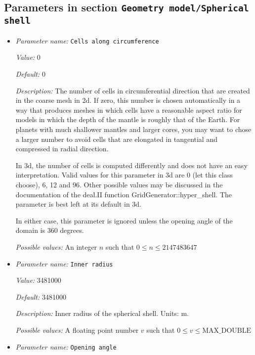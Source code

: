 \subsection{Parameters in section \tt Geometry model/Spherical shell}
\label{parameters:Geometry_20model/Spherical_20shell}

\begin{itemize}
\item {\it Parameter name:} {\tt Cells along circumference}
\label{parameters:Geometry model/Spherical shell/Cells along circumference}


{\it Value:} 0


{\it Default:} 0


{\it Description:} The number of cells in circumferential direction that are created in the coarse mesh in 2d. If zero, this number is chosen automatically in a way that produces meshes in which cells have a reasonable aspect ratio for models in which the depth of the mantle is roughly that of the Earth. For planets with much shallower mantles and larger cores, you may want to chose a larger number to avoid cells that are elongated in tangential and compressed in radial direction.

In 3d, the number of cells is computed differently and does not have an easy interpretation. Valid values for this parameter in 3d are 0 (let this class choose), 6, 12 and 96. Other possible values may be discussed in the documentation of the deal.II function GridGenerator::hyper\_shell. The parameter is best left at its default in 3d.

In either case, this parameter is ignored unless the opening angle of the domain is 360 degrees.


{\it Possible values:} An integer $n$ such that $0\leq n \leq 2147483647$
\item {\it Parameter name:} {\tt Inner radius}
\label{parameters:Geometry model/Spherical shell/Inner radius}


{\it Value:} 3481000


{\it Default:} 3481000


{\it Description:} Inner radius of the spherical shell. Units: m.


{\it Possible values:} A floating point number $v$ such that $0 \leq v \leq \text{MAX\_DOUBLE}$
\item {\it Parameter name:} {\tt Opening angle}
\label{parameters:Geometry model/Spherical shell/Opening angle}



\end{itemize}
